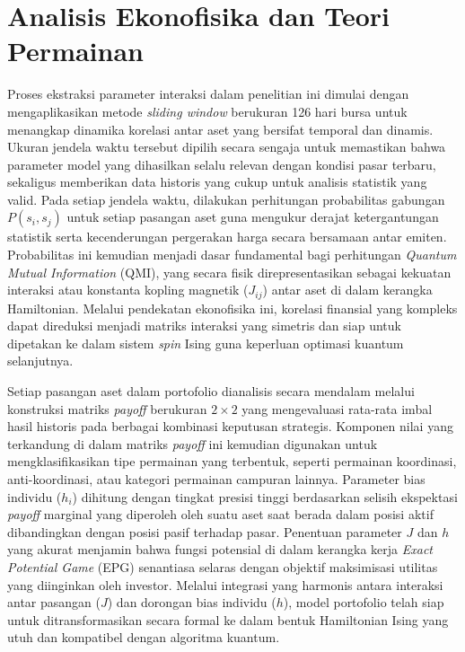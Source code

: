 \section{Analisis Ekonofisika dan Teori Permainan}
Proses ekstraksi parameter interaksi dalam penelitian ini dimulai dengan mengaplikasikan metode \textit{sliding window} berukuran 126 hari bursa untuk menangkap dinamika korelasi antar aset yang bersifat temporal dan dinamis. Ukuran jendela waktu tersebut dipilih secara sengaja untuk memastikan bahwa parameter model yang dihasilkan selalu relevan dengan kondisi pasar terbaru, sekaligus memberikan data historis yang cukup untuk analisis statistik yang valid. Pada setiap jendela waktu, dilakukan perhitungan probabilitas gabungan $P(s_i, s_j)$ untuk setiap pasangan aset guna mengukur derajat ketergantungan statistik serta kecenderungan pergerakan harga secara bersamaan antar emiten. Probabilitas ini kemudian menjadi dasar fundamental bagi perhitungan \textit{Quantum Mutual Information} (QMI), yang secara fisik direpresentasikan sebagai kekuatan interaksi atau konstanta kopling magnetik ($J_{ij}$) antar aset di dalam kerangka Hamiltonian. Melalui pendekatan ekonofisika ini, korelasi finansial yang kompleks dapat direduksi menjadi matriks interaksi yang simetris dan siap untuk dipetakan ke dalam sistem \textit{spin} Ising guna keperluan optimasi kuantum selanjutnya.

Setiap pasangan aset dalam portofolio dianalisis secara mendalam melalui konstruksi matriks \textit{payoff} berukuran $2 \times 2$ yang mengevaluasi rata-rata imbal hasil historis pada berbagai kombinasi keputusan strategis. Komponen nilai yang terkandung di dalam matriks \textit{payoff} ini kemudian digunakan untuk mengklasifikasikan tipe permainan yang terbentuk, seperti permainan koordinasi, anti-koordinasi, atau kategori permainan campuran lainnya. Parameter bias individu ($h_i$) dihitung dengan tingkat presisi tinggi berdasarkan selisih ekspektasi \textit{payoff} marginal yang diperoleh oleh suatu aset saat berada dalam posisi aktif dibandingkan dengan posisi pasif terhadap pasar. Penentuan parameter $J$ dan $h$ yang akurat menjamin bahwa fungsi potensial di dalam kerangka kerja \textit{Exact Potential Game} (EPG) senantiasa selaras dengan objektif maksimisasi utilitas yang diinginkan oleh investor. Melalui integrasi yang harmonis antara interaksi antar pasangan ($J$) dan dorongan bias individu ($h$), model portofolio telah siap untuk ditransformasikan secara formal ke dalam bentuk Hamiltonian Ising yang utuh dan kompatibel dengan algoritma kuantum.
